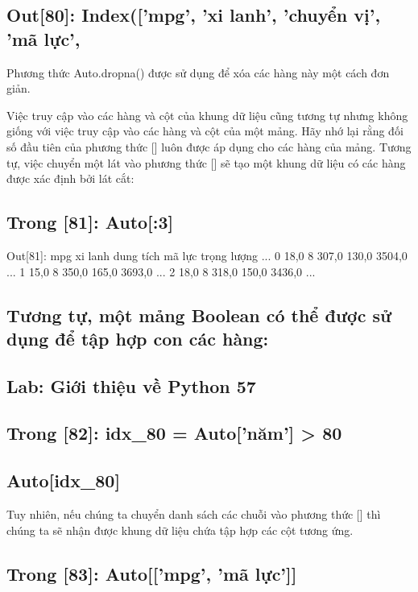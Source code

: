 \subsection{Out[80]: Index(['mpg', 'xi lanh', 'chuyển vị', 'mã lực',}

Phương thức Auto.dropna() được sử dụng để xóa các hàng này một cách đơn giản.

Việc truy cập vào các hàng và cột của khung dữ liệu cũng tương tự nhưng không giống với việc truy cập vào các hàng và cột của một mảng. Hãy nhớ lại rằng đối số đầu tiên của phương thức [] luôn được áp dụng cho các hàng của mảng. Tương tự, việc chuyển một lát vào phương thức [] sẽ tạo một khung dữ liệu có các hàng được xác định bởi lát cắt:

\subsection{Trong [81]: Auto[:3]}

Out[81]: mpg xi lanh dung tích mã lực trọng lượng ... 0 18,0 8 307,0 130,0 3504,0 ... 1 15,0 8 350,0 165,0 3693,0 ... 2 18,0 8 318,0 150,0 3436,0 ...

\subsection{Tương tự, một mảng Boolean có thể được sử dụng để tập hợp con các hàng:}

\subsection{Lab: Giới thiệu về Python 57}

\subsection{Trong [82]: idx\_80 = Auto['năm'] > 80}

\subsection{Auto[idx\_80]}

Tuy nhiên, nếu chúng ta chuyển danh sách các chuỗi vào phương thức [] thì chúng ta sẽ nhận được khung dữ liệu chứa tập hợp các cột tương ứng.

\subsection{Trong [83]: Auto[['mpg', 'mã lực']]}

